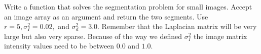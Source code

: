 \begin{problem}  Write a function  that solves the segmentation problem for small images.
Accept an image array as an argument and return the two segments.
Use $r = 5, \sigma_I^2 = 0.02,$ and $\sigma_d^2 = 3.0$.
Remember that the Laplacian matrix will be very large but also very sparse.
Because of the way we defined $\sigma_I^2$ the image matrix intensity values need to be between $0.0$ and $1.0$.
\end{problem}
